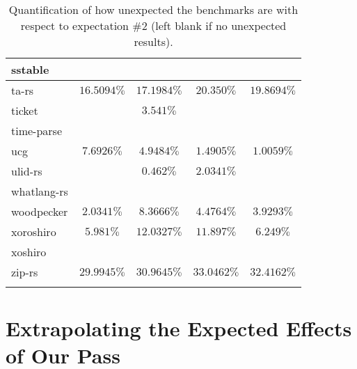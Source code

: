 \documentclass{article}
\begin{document}
\begin{longtable}[h!]{|l|c|c|c|c|}
    \hline
    sstable &  &  &  &  \\ %
     \hline
    ta-rs & $16.5094\%$ & $17.1984\%$ & $20.350\%$ & $19.8694\%$ \\ %
    \hline
    ticket &  & $3.541\%$ &  &  \\ %
    \hline
    time-parse &  &  &  &  \\ %
    \hline
    ucg & $7.6926\%$ & $4.9484\%$ & $1.4905\%$ & $1.0059\%$ \\ %
    \hline
    ulid-rs &  & $0.462\%$ & $2.0341\%$ &  \\ %
    \hline
    whatlang-rs &  &  &  &  \\ %
     \hline
    woodpecker & $2.0341\%$ & $8.3666\%$ & $4.4764\%$ & $3.9293\%$ \\ %
    \hline
    xoroshiro & $5.981\%$ & $12.0327\%$ & $11.897\%$ & $6.249\%$ \\ %
    \hline
    xoshiro &  &  &  &  \\ %
    \hline
    zip-rs & $29.9945\%$ & $30.9645\%$ & $33.0462\%$ & $32.4162\%$ \\ %
    \hline
  \caption{Quantification of how unexpected the benchmarks are with respect to expectation \#2 (left blank if no unexpected results).}
  \label{table:quant2}
\end{longtable}

\section{Extrapolating the Expected Effects of Our Pass}
\end{document}
